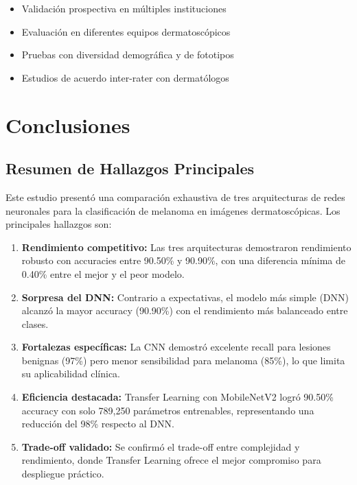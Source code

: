 \documentclass[11pt, a4paper]{article}
\begin{document}
\begin{itemize}
    \item Validación prospectiva en múltiples instituciones
    \item Evaluación en diferentes equipos dermatoscópicos
    \item Pruebas con diversidad demográfica y de fototipos
    \item Estudios de acuerdo inter-rater con dermatólogos
\end{itemize}

\section{Conclusiones}

\subsection{Resumen de Hallazgos Principales}

Este estudio presentó una comparación exhaustiva de tres arquitecturas de redes neuronales para la clasificación de melanoma en imágenes dermatoscópicas. Los principales hallazgos son:

\begin{enumerate}
    \item \textbf{Rendimiento competitivo:} Las tres arquitecturas demostraron rendimiento robusto con accuracies entre 90.50\% y 90.90\%, con una diferencia mínima de 0.40\% entre el mejor y el peor modelo.
    
    \item \textbf{Sorpresa del DNN:} Contrario a expectativas, el modelo más simple (DNN) alcanzó la mayor accuracy (90.90\%) con el rendimiento más balanceado entre clases.
    
    \item \textbf{Fortalezas específicas:} La CNN demostró excelente recall para lesiones benignas (97\%) pero menor sensibilidad para melanoma (85\%), lo que limita su aplicabilidad clínica.
    
    \item \textbf{Eficiencia destacada:} Transfer Learning con MobileNetV2 logró 90.50\% accuracy con solo 789,250 parámetros entrenables, representando una reducción del 98\% respecto al DNN.
    
    \item \textbf{Trade-off validado:} Se confirmó el trade-off entre complejidad y rendimiento, donde Transfer Learning ofrece el mejor compromiso para despliegue práctico.
\end{enumerate}
\end{document}
